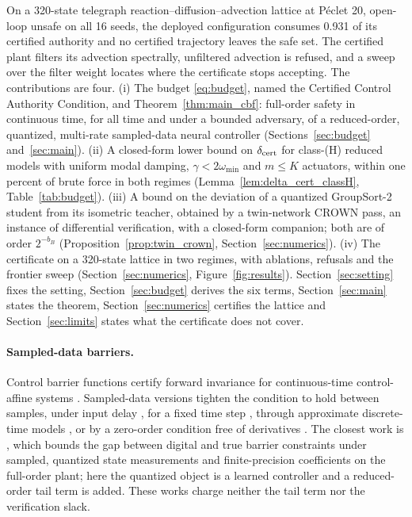 On a 320-state telegraph reaction--diffusion--advection lattice at P\'eclet 20, open-loop unsafe on all 16 seeds, the deployed configuration consumes 0.931 of its certified authority and no certified trajectory leaves the safe set. The certified plant filters its advection spectrally, unfiltered advection is refused, and a sweep over the filter weight locates where the certificate stops accepting. The contributions are four. (i) The budget \eqref{eq:budget}, named the Certified Control Authority Condition, and Theorem~\ref{thm:main_cbf}: full-order safety in continuous time, for all time and under a bounded adversary, of a reduced-order, quantized, multi-rate sampled-data neural controller (Sections~\ref{sec:budget} and~\ref{sec:main}). (ii) A closed-form lower bound on $\delta_{\mathrm{cert}}$ for class-(H) reduced models with uniform modal damping, $\gamma < 2\omega_{\min}$ and $m \le K$ actuators, within one percent of brute force in both regimes (Lemma~\ref{lem:delta_cert_classH}, Table~\ref{tab:budget}). (iii) A bound on the deviation of a quantized GroupSort-2 student from its isometric teacher, obtained by a twin-network CROWN pass, an instance of differential verification, with a closed-form companion; both are of order $2^{-b_B}$ (Proposition~\ref{prop:twin_crown}, Section~\ref{sec:numerics}). (iv) The certificate on a 320-state lattice in two regimes, with ablations, refusals and the frontier sweep (Section~\ref{sec:numerics}, Figure~\ref{fig:results}). Section~\ref{sec:setting} fixes the setting, Section~\ref{sec:budget} derives the six terms, Section~\ref{sec:main} states the theorem, Section~\ref{sec:numerics} certifies the lattice and Section~\ref{sec:limits} states what the certificate does not cover.

\paragraph{Sampled-data barriers.}
Control barrier functions certify forward invariance for continuous-time control-affine systems \citep{ames2017cbf,ames2019theory}. Sampled-data versions tighten the condition to hold between samples, under input delay \citep{singletary2020sampled}, for a fixed time step \citep{breeden2022sampled}, through approximate discrete-time models \citep{taylor2022sampled}, or by a zero-order condition free of derivatives \citep{tan2025zeroorder}. The closest work is \citet{niu2024sampling}, which bounds the gap between digital and true barrier constraints under sampled, quantized state measurements and finite-precision coefficients on the full-order plant; here the quantized object is a learned controller and a reduced-order tail term is added. These works charge neither the tail term nor the verification slack.

